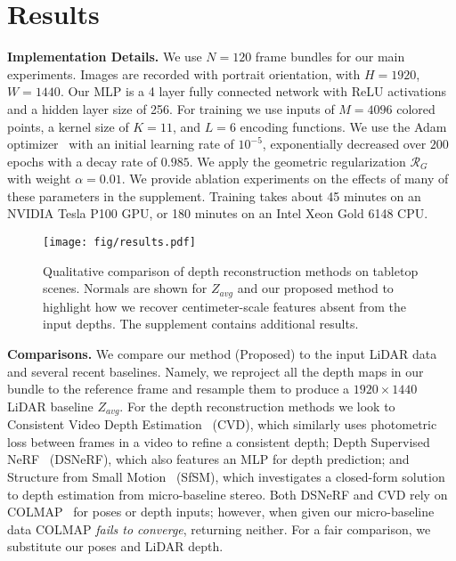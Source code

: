 \section{Results}\label{sec:results}
\vspace{0.5em}\noindent\textbf{Implementation Details.}\hspace{0.1em} We use $N=120$ frame bundles for our main experiments. Images are recorded with portrait orientation, with $H=1920$, $W=1440$. Our MLP is a 4 layer fully connected network with ReLU activations and a hidden layer size of 256. For training we use inputs of $M=4096$ colored points, a kernel size of $K=11$, and $L=6$ encoding functions. We use the Adam optimizer~\cite{kingma2014adam} with an initial learning rate of $10^{-5}$, exponentially decreased over $200$ epochs with a decay rate of $0.985$. We apply the geometric regularization $\mathcal{R}_G$ with weight $\alpha=0.01$. We provide ablation experiments on the effects of many of these parameters in the supplement. Training takes about 45 minutes on an NVIDIA Tesla P100 GPU, or 180 minutes on an Intel Xeon Gold 6148 CPU.

\begin{figure*}[t]
    \centering
    \texttt{[image: fig/results.pdf]}
    \caption{Qualitative comparison of depth reconstruction methods on tabletop scenes. Normals are shown for $Z_{avg}$ and our proposed method to highlight how we recover centimeter-scale features absent from the input depths. The supplement contains additional results.}
    \label{fig:results}
    \vspace{-1em}
\end{figure*}

\vspace{0.5em}\noindent\textbf{Comparisons.}\hspace{0.1em} We compare our method (Proposed) to the input LiDAR data and several recent baselines. Namely, we reproject all the depth maps in our bundle to the reference frame and resample them to produce a $1920\times1440$ LiDAR baseline $Z_{avg}$. For the depth reconstruction methods we look to Consistent Video Depth Estimation~\cite{luo2020consistent} (CVD), which similarly uses photometric loss between frames in a video to refine a consistent depth; Depth Supervised NeRF~\cite{deng2021depth} (DSNeRF), which also features an MLP for depth prediction; and Structure from Small Motion~\cite{ha2016high} (SfSM), which investigates a closed-form solution to depth estimation from micro-baseline stereo. Both DSNeRF and CVD rely on COLMAP~\cite{schonberger2016structure} for poses or depth inputs; however, when given our micro-baseline data COLMAP \emph{fails to converge}, returning neither. For a fair comparison, we substitute our poses and LiDAR depth.

